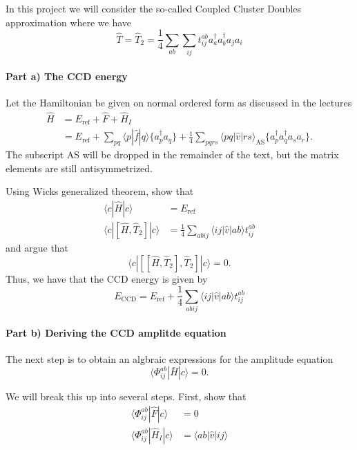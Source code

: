 \documentclass[a4paper,10pt]{article}
\newcommand{\braket}[1]{\langle#1\rangle}
\theoremstyle{definition}
\begin{document}
In this project we will consider the so-called Coupled Cluster Doubles approximation where we have 
\begin{equation}
\hat{T} = \hat{T}_2 = \frac{1}{4} \sum_{ab}\sum_{ij} t^{ab}_{ij} a_a^\dagger a_b^\dagger a_j a_i 
\end{equation}

\paragraph{Part a) The CCD energy}
Let the Hamiltonian be given on normal ordered form as discussed in the lectures 
\begin{align}
 \hat{H} &= E_\text{ref} + \hat{F} + \hat{H}_I \\
 &= E_\text{ref} + \sum_{pq} \braket{p|\hat{f}|q}\{a_p^\dagger a_q\} + \frac{1}{4}\sum_{pqrs} \braket{pq|\hat{v}|rs}_\text{AS} \{ a_p^\dagger a_q^\dagger a_s a_r \}.
\end{align}
The subscript AS will be dropped in the remainder of the text, but the matrix elements are still antisymmetrized.

Using Wicks generalized theorem, show that 
\begin{align}
 \braket{c|\hat{H}|c} &= E_\text{ref} \\
 \braket{c|[\hat{H},\hat{T}_2]|c} &= \frac{1}{4} \sum_{abij} \braket{ij|\hat{v}|ab} t^{ab}_{ij}
\end{align}
and argue that 
\begin{equation}
 \braket{c|[[\hat{H},\hat{T}_2],\hat{T}_2]|c} = 0.
\end{equation}
Thus, we have that the CCD energy is given by 
\begin{equation}
 E_\text{CCD} = E_\text{ref} + \frac{1}{4} \sum_{abij} \braket{ij|\hat{v}|ab} t^{ab}_{ij} \label{CCDenergy}
\end{equation}

\paragraph{Part b) Deriving the CCD amplitde equation}
The next step is to obtain an algbraic expressions for the amplitude equation 
\begin{equation}
 \braket{\Phi^{ab}_{ij}|\bar{H}|c} = 0 \label{amplitudeEquation}.
\end{equation}

We will break this up into several steps. First, show that 
\begin{align}
 \braket{\Phi^{ab}_{ij}|\hat{F}|c} &= 0 \\
 \braket{\Phi^{ab}_{ij}|\hat{H}_I|c} &= \braket{ab|\hat{v}|ij} 
\end{align}
\end{document}
